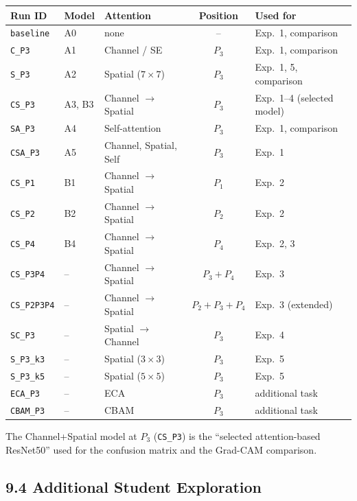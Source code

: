 \documentclass[11pt]{article}
\begin{document}
\begin{center}
\small
\begin{tabular}{|l|l|l|c|l|}
\hline
Run ID & Model & Attention & Position & Used for\\
\hline
\texttt{baseline} & A0 & none & -- & Exp.~1, comparison\\
\texttt{C\_P3} & A1 & Channel / SE & $P_3$ & Exp.~1, comparison\\
\texttt{S\_P3} & A2 & Spatial ($7\times7$) & $P_3$ & Exp.~1, 5, comparison\\
\texttt{CS\_P3} & A3, B3 & Channel $\rightarrow$ Spatial & $P_3$ & Exp.~1--4 (selected model)\\
\texttt{SA\_P3} & A4 & Self-attention & $P_3$ & Exp.~1, comparison\\
\texttt{CSA\_P3} & A5 & Channel, Spatial, Self & $P_3$ & Exp.~1\\
\texttt{CS\_P1} & B1 & Channel $\rightarrow$ Spatial & $P_1$ & Exp.~2\\
\texttt{CS\_P2} & B2 & Channel $\rightarrow$ Spatial & $P_2$ & Exp.~2\\
\texttt{CS\_P4} & B4 & Channel $\rightarrow$ Spatial & $P_4$ & Exp.~2, 3\\
\texttt{CS\_P3P4} & -- & Channel $\rightarrow$ Spatial & $P_3+P_4$ & Exp.~3\\
\texttt{CS\_P2P3P4} & -- & Channel $\rightarrow$ Spatial & $P_2+P_3+P_4$ & Exp.~3 (extended)\\
\texttt{SC\_P3} & -- & Spatial $\rightarrow$ Channel & $P_3$ & Exp.~4\\
\texttt{S\_P3\_k3} & -- & Spatial ($3\times3$) & $P_3$ & Exp.~5\\
\texttt{S\_P3\_k5} & -- & Spatial ($5\times5$) & $P_3$ & Exp.~5\\
\texttt{ECA\_P3} & -- & ECA & $P_3$ & additional task\\
\texttt{CBAM\_P3} & -- & CBAM & $P_3$ & additional task\\
\hline
\end{tabular}
\end{center}

The Channel+Spatial model at $P_3$ (\texttt{CS\_P3}) is the ``selected
attention-based ResNet50'' used for the confusion matrix and the Grad-CAM
comparison.

\subsection*{9.4 Additional Student Exploration}
\end{document}
